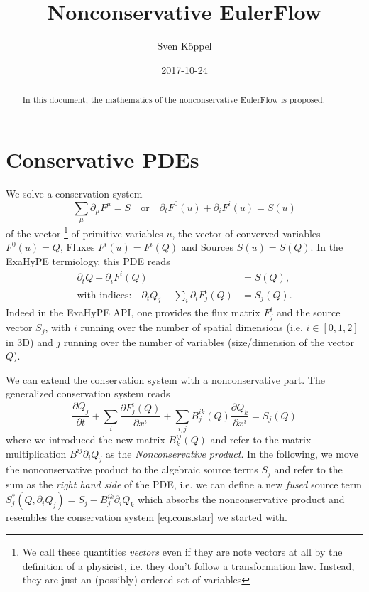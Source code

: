 \documentclass[a4paper]{article}
\title{Nonconservative EulerFlow}
\author{Sven Köppel}
\date{2017-10-24}
\newcommand{\pp}[2]{\frac{\partial #1}{\partial #2}}
\begin{document}
\maketitle

\begin{abstract}
In this document, the mathematics of the nonconservative
EulerFlow is proposed.
\end{abstract}

\tableofcontents

\section{Conservative PDEs}

We solve a conservation system
\begin{equation}\label{eq.cons.star}
\sum_\mu
\partial_\mu F^\mu=S
\quad\text{or}\quad
\partial_t F^0(u) + \partial_i F^i(u) = S(u)
\end{equation}
of the vector%
\footnote{We call these quantities \emph{vectors} even if they
are note vectors at all by the definition of a physicist, i.e.
they don't follow a transformation law. Instead, they are just
an (possibly) ordered set of variables}
of primitive variables $u$, the vector of converved variables
$F^0(u)=Q$, Fluxes $F^i(u)=F^i(Q)$ and Sources $S(u)=S(Q)$. In the
ExaHyPE termiology, this PDE reads
\begin{align}
\partial_t Q + \partial_i F^i(Q) &= S(Q), \\
\text{with indices:}\quad
\partial_t Q_j + \sum_i \partial_i F^i_j(Q) &= S_j(Q).
\end{align}
Indeed in the ExaHyPE API, one provides the flux matrix
$F^i_j$ and the source vector $S_j$, with $i$ running over the
number of spatial dimensions (i.e. $i\in[0,1,2]$ in 3D) and $j$
running over the number of variables (size/dimension of the vector $Q$).

We can extend the conservation system with a nonconservative part.
The generalized conservation system reads
\begin{equation}
\pp {Q_j}t + \sum_i \pp {F^i_j(Q)}{x^i} + \sum_{i,j} B^{ik}_j(Q) \pp {Q_k}{x^i} = S_j(Q)
\end{equation}
where we introduced the new matrix $B^{ij}_k(Q)$ and refer to the
matrix multiplication $B^{ij}\partial_i Q_j$ as the
\emph{Nonconservative product}. In the following, we move the
nonconservative product to the algebraic source terms $S_j$
and refer to the sum as the \emph{right hand side} of the PDE,
i.e. we can define a new \emph{fused} source term
$S^*_j(Q, \partial_i Q_j)=S_j - B^{ik}_j\partial_i Q_k$
which absorbs the nonconservative product and resembles the
conservation system \eqref{eq.cons.star} we started with.
\end{document}
